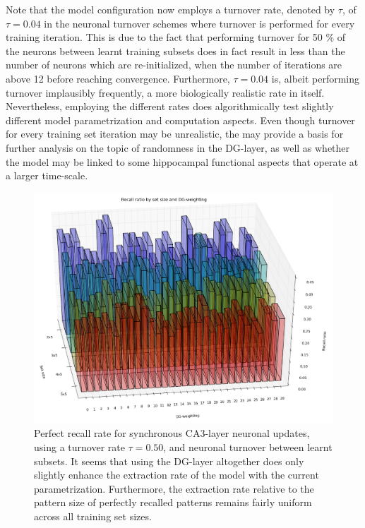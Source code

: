 Note that the model configuration now employs a turnover rate, denoted by $\tau$, of $\tau=0.04$ in the neuronal turnover schemes where turnover is performed for every training iteration. This is due to the fact that performing turnover for 50 \% of the neurons between learnt training subsets does in fact result in less than the number of neurons which are re-initialized, when the number of iterations are above 12 before reaching convergence. Furthermore, $\tau=0.04$ is, albeit performing turnover implausibly frequently, a more biologically realistic rate in itself. Nevertheless, employing the different rates does algorithmically test slightly different model parametrization and computation aspects. Even though turnover for every training set iteration may be unrealistic, the may provide a basis for further analysis on the topic of randomness in the DG-layer, as well as whether the model may be linked to some hippocampal functional aspects that operate at a larger time-scale.


\begin{figure}
    \centering
    \includegraphics[width=13cm]{fig/DGWs/cut/avg_recall_ratio_by_dgw_sync_tm0_50_cut}
    \caption{Perfect recall rate for synchronous CA3-layer neuronal updates, using a turnover rate $\tau=0.50$, and neuronal turnover between learnt subsets. It seems that using the DG-layer altogether does only slightly enhance the extraction rate of the model with the current parametrization. Furthermore, the extraction rate relative to the pattern size of perfectly recalled patterns remains fairly uniform across all training set sizes.}
    \label{fig:avg_recall_ratio_by_dgw_sync_tm0_50}
\end{figure}

